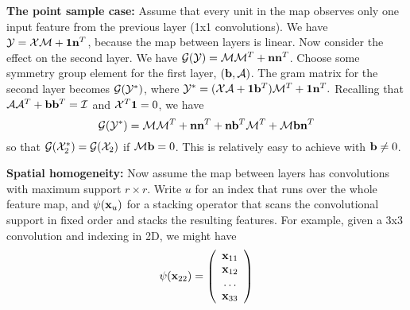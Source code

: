 {\bf The point sample case:} Assume that every unit in the map
observes only one input feature from the previous layer (1x1
convolutions).   We have ${\cal {Y}}={\cal {X}}{\cal {M}}+{\bf {1}}{\bf {n}}^T$, because the map 
between layers is linear. Now consider the effect on the second layer.
We have ${\cal G}({\cal {Y}})={\cal {M}}{\cal {M}}^T+{\bf {n}}{\bf {n}}^T$.
Choose some symmetry group element for the first layer,
$\left({\bf {b}}, {\cal {A}}\right)$.  The gram matrix for the second
layer becomes ${\cal G}({\cal {Y}}^*)$, where
${\cal {Y}}^*=({\cal {X}} {\cal {A}}+{\bf {1}}{\bf {b}}^T){\cal {M}}^T+{\bf {1}}{\bf {n}}^T.$
Recalling that ${\cal {A}}{\cal {A}}^T+{\bf {b}}{\bf {b}}^T={\cal {I}}$ and
${\cal {X}}^T{\bf {1}}=0$, we have 
\[
{\cal
  G}({\cal {Y}}^*)={\cal {M}}{\cal {M}}^T+{\bf {n}}{\bf {n}}^T+{\bf {n}}{\bf {b}}^T{\cal {M}}^T+{\cal {M}}{\bf {b}}{\bf {n}}^T
\]
so that ${\cal G}({\cal {X}}_2^*)={\cal G}({\cal {X}}_2)$ if
${\cal {M}}{\bf {b}}=0$.  This is relatively easy to achieve with
${\bf {b}}\neq 0$.

{\bf Spatial homogeneity:} Now assume the map between layers has
convolutions with maximum support $r \times r$.  Write $u$ for an
index that runs over the whole feature map, and $\psi({\bf {x}}_u)$ for
a stacking operator that scans the convolutional support in fixed
order and stacks the resulting features. For example, given a 3x3
convolution and indexing in 2D, we might have
\[
\psi({\bf {x}}_{22})=\left(\begin{array}{c}{\bf {x}}_{11}\\
{\bf {x}}_{12}\\
\ldots\\
{\bf {x}}_{33}
\end{array}\right)
\]

